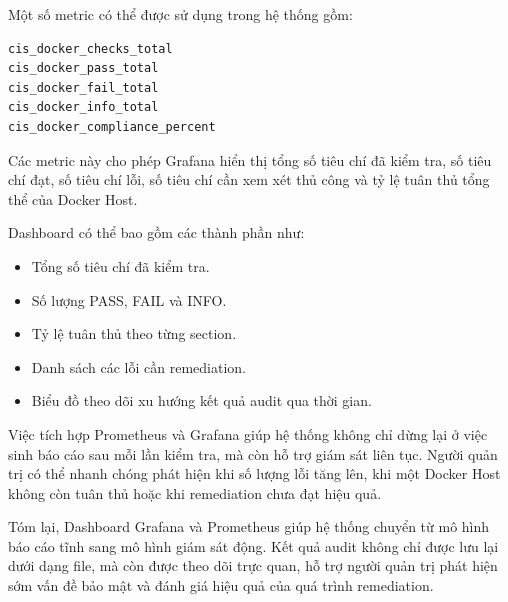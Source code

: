 Một số metric có thể được sử dụng trong hệ thống gồm:

\begin{verbatim}
cis_docker_checks_total
cis_docker_pass_total
cis_docker_fail_total
cis_docker_info_total
cis_docker_compliance_percent
\end{verbatim}

Các metric này cho phép Grafana hiển thị tổng số tiêu chí đã kiểm tra, số tiêu chí đạt, số tiêu chí lỗi, số tiêu chí cần xem xét thủ công và tỷ lệ tuân thủ tổng thể của Docker Host.

Dashboard có thể bao gồm các thành phần như:

\begin{itemize}
\item Tổng số tiêu chí đã kiểm tra.
\item Số lượng PASS, FAIL và INFO.
\item Tỷ lệ tuân thủ theo từng section.
\item Danh sách các lỗi cần remediation.
\item Biểu đồ theo dõi xu hướng kết quả audit qua thời gian.
\end{itemize}

Việc tích hợp Prometheus và Grafana giúp hệ thống không chỉ dừng lại ở việc sinh báo cáo sau mỗi lần kiểm tra, mà còn hỗ trợ giám sát liên tục. Người quản trị có thể nhanh chóng phát hiện khi số lượng lỗi tăng lên, khi một Docker Host không còn tuân thủ hoặc khi remediation chưa đạt hiệu quả.

Tóm lại, Dashboard Grafana và Prometheus giúp hệ thống chuyển từ mô hình báo cáo tĩnh sang mô hình giám sát động. Kết quả audit không chỉ được lưu lại dưới dạng file, mà còn được theo dõi trực quan, hỗ trợ người quản trị phát hiện sớm vấn đề bảo mật và đánh giá hiệu quả của quá trình remediation.
